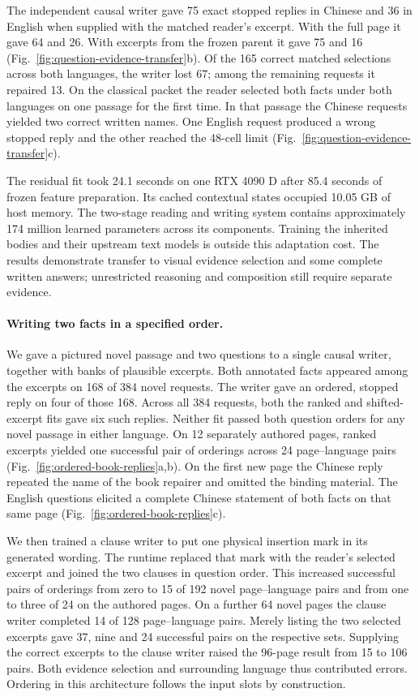 \documentclass[12pt,a4paper]{article}
\providecommand{\DIFadd}[1]{{\protect\color{blue} \sf #1}} %
\begin{document}
\DIFadd{The independent causal writer gave 75 exact stopped replies in Chinese and 36 in English when supplied with the matched reader's excerpt. With the full page it gave 64 and 26. With excerpts from the frozen parent it gave 75 and 16 (Fig.~\ref{fig:question-evidence-transfer}b). Of the 165 correct matched selections across both languages, the writer lost 67; among the remaining requests it repaired 13. On the classical packet the reader selected both facts under both languages on one passage for the first time. In that passage the Chinese requests yielded two correct written names. One English request produced a wrong stopped reply and the other reached the 48-cell limit (Fig.~\ref{fig:question-evidence-transfer}c).
}

\DIFadd{The residual fit took 24.1 seconds on one RTX 4090 D after 85.4 seconds of frozen feature preparation. Its cached contextual states occupied 10.05 GB of host memory. The two-stage reading and writing system contains approximately 174 million learned parameters across its components. Training the inherited bodies and their upstream text models is outside this adaptation cost. The results demonstrate transfer to visual evidence selection and some complete written answers; unrestricted reasoning and composition still require separate evidence.
}

\paragraph{\DIFadd{Writing two facts in a specified order.}}
\DIFadd{We gave a pictured novel passage and two questions to a single causal writer, together with banks of plausible excerpts. Both annotated facts appeared among the excerpts on 168 of 384 novel requests. The writer gave an ordered, stopped reply on four of those 168. Across all 384 requests, both the ranked and shifted-excerpt fits gave six such replies. Neither fit passed both question orders for any novel passage in either language. On 12 separately authored pages, ranked excerpts yielded one successful pair of orderings across 24 page--language pairs (Fig.~\ref{fig:ordered-book-replies}a,b). On the first new page the Chinese reply repeated the name of the book repairer and omitted the binding material. The English questions elicited a complete Chinese statement of both facts on that same page (Fig.~\ref{fig:ordered-book-replies}c).
}

\DIFadd{We then trained a clause writer to put one physical insertion mark in its generated wording. The runtime replaced that mark with the reader's selected excerpt and joined the two clauses in question order. This increased successful pairs of orderings from zero to 15 of 192 novel page--language pairs and from one to three of 24 on the authored pages. On a further 64 novel pages the clause writer completed 14 of 128 page--language pairs. Merely listing the two selected excerpts gave 37, nine and 24 successful pairs on the respective sets. Supplying the correct excerpts to the clause writer raised the 96-page result from 15 to 106 pairs. Both evidence selection and surrounding language thus contributed errors. Ordering in this architecture follows the input slots by construction.
}
\end{document}
